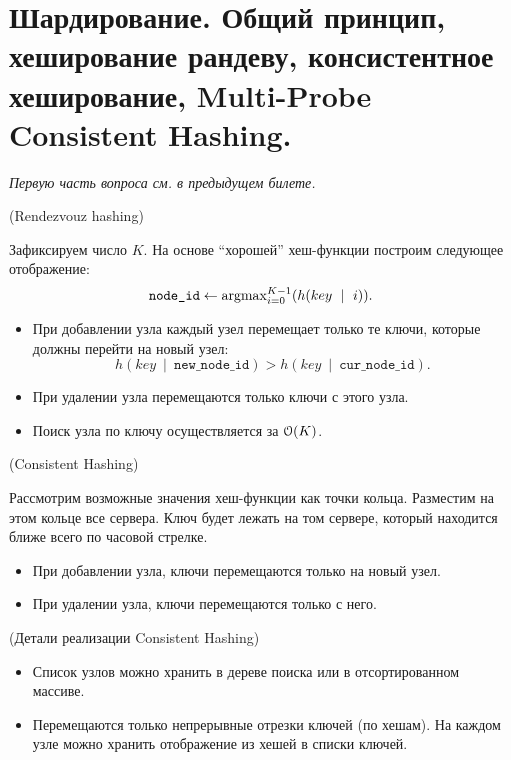 \section{Шардирование. Общий принцип, хеширование рандеву, консистентное 
хеширование, Multi-Probe Consistent Hashing.}

\textit{Первую часть вопроса см. в предыдущем билете.}

\begin{algorithm}(Rendezvouz hashing)
    
    Зафиксируем число $K$. На основе ``хорошей'' хеш-функции построим
    следующее отображение:
    \[
        \texttt{node\_id} \leftarrow \operatorname{argmax}_{i = 0}^{K - 1}(h(key~\mid~i))
    .\]
    \begin{itemize}
        \item При добавлении узла каждый узел перемещает только те ключи,
            которые должны перейти на новый узел:
            \[
                h(key~\mid~\texttt{new\_node\_id}) > h(key~\mid~\texttt{cur\_node\_id})
            .\]
        \item При удалении узла перемещаются только ключи с этого узла.
        \item Поиск узла по ключу осуществляется за $\mathcal{O}(K)$.
    \end{itemize}
\end{algorithm} 

\begin{algorithm}(Consistent Hashing)
    
    Рассмотрим возможные значения хеш-функции как точки кольца. Разместим на этом
    кольце все сервера. Ключ будет лежать на том сервере, который находится ближе всего
    по часовой стрелке. 
    \begin{itemize}
        \item При добавлении узла, ключи перемещаются только на новый узел.
        \item При удалении узла, ключи перемещаются только с него.
    \end{itemize}
\end{algorithm}

\begin{remark}(Детали реализации Consistent Hashing)
    \enewline
    \begin{itemize}
        \item Список узлов можно хранить в дереве поиска или в отсортированном массиве.
        \item Перемещаются только непрерывные отрезки ключей (по хешам). На каждом
            узле можно хранить отображение из хешей в списки ключей.
    \end{itemize}
\end{remark}

